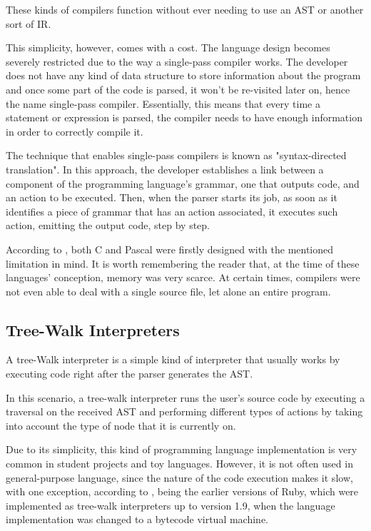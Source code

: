 These kinds of compilers function without ever needing to use an AST or another sort of IR.

This simplicity, however, comes with a cost. The language design becomes severely restricted due to the way a single-pass compiler works. The developer does not have any kind of data structure to store information about the program and once some part of the code is parsed, it won't be re-visited later on, hence the name single-pass compiler. Essentially, this means that every time a statement or expression is parsed, the compiler needs to have enough information in order to correctly compile it.

The technique that enables single-pass compilers is known as "syntax-directed translation". In this approach, the developer establishes a link between a component of the programming language's grammar, one that outputs code, and an action to be executed. Then, when the parser starts its job, as soon as it identifies a piece of grammar that has an action associated, it executes such action, emitting the output code, step by step.

According to \cite{nystrom2021crafting}, both C and Pascal were firstly designed with the mentioned limitation in mind. It is worth remembering the reader that, at the time of these languages' conception, memory was very scarce. At certain times, compilers were not even able to deal with a single source file, let alone an entire program.

\subsection{Tree-Walk Interpreters}
A tree-Walk interpreter is a simple kind of interpreter that usually works by executing code right after the parser generates the AST.

In this scenario, a tree-walk interpreter runs the user's source code by executing a traversal on the received AST and performing different types of actions by taking into account the type of node that it is currently on.

Due to its simplicity, this kind of programming language implementation is very common in student projects and toy languages. However, it is not often used in general-purpose language, since the nature of the code execution makes it slow, with one exception, according to \cite{nystrom2021crafting}, being the earlier versions of Ruby, which were implemented as tree-walk interpreters up to version 1.9, when the language implementation was changed to a bytecode virtual machine.

